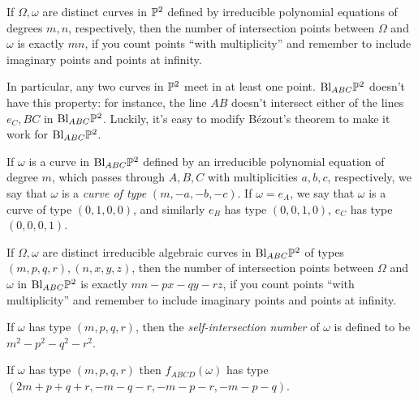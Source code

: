 \begin{thm}[B\'ezout] If $\Omega,\omega$ are distinct curves in $\mathbb{P}^2$ defined by irreducible polynomial equations of degrees $m,n$, respectively, then the number of intersection points between $\Omega$ and $\omega$ is exactly $mn$, if you count points ``with multiplicity'' and remember to include imaginary points and points at infinity.
\end{thm}

In particular, any two curves in $\mathbb{P}^2$ meet in at least one point. $\text{\rm Bl}_{ABC}\mathbb{P}^2$ doesn't have this property: for instance, the line $AB$ doesn't intersect either of the lines $e_C, BC$ in $\text{\rm Bl}_{ABC}\mathbb{P}^2$. Luckily, it's easy to modify B\'ezout's theorem to make it work for $\text{\rm Bl}_{ABC}\mathbb{P}^2$.

\begin{defn} If $\omega$ is a curve in $\text{\rm Bl}_{ABC}\mathbb{P}^2$ defined by an irreducible polynomial equation of degree $m$, which passes through $A,B,C$ with multiplicities $a,b,c$, respectively, we say that $\omega$ is a \emph{curve of type} $(m,-a,-b,-c)$. If $\omega = e_A$, we say that $\omega$ is a curve of type $(0,1,0,0)$, and similarly $e_B$ has type $(0,0,1,0)$, $e_C$ has type $(0,0,0,1)$.
\end{defn}

\begin{thm}\label{intersection} If $\Omega,\omega$ are distinct irreducible algebraic curves in $\text{\rm Bl}_{ABC}\mathbb{P}^2$ of types $(m,p,q,r), (n,x,y,z)$, then the number of intersection points between $\Omega$ and $\omega$ in $\text{\rm Bl}_{ABC}\mathbb{P}^2$ is exactly $mn - px - qy - rz$, if you count points ``with multiplicity'' and remember to include imaginary points and points at infinity.
\end{thm}

\begin{defn} If $\omega$ has type $(m,p,q,r)$, then the \emph{self-intersection number} of $\omega$ is defined to be $m^2 - p^2 - q^2 - r^2$.
\end{defn}

\begin{prop}\label{cremona-type} If $\omega$ has type $(m,p,q,r)$ then $f_{ABCD}(\omega)$ has type $(2m+p+q+r,-m-q-r,-m-p-r,-m-p-q)$.
\end{prop}

